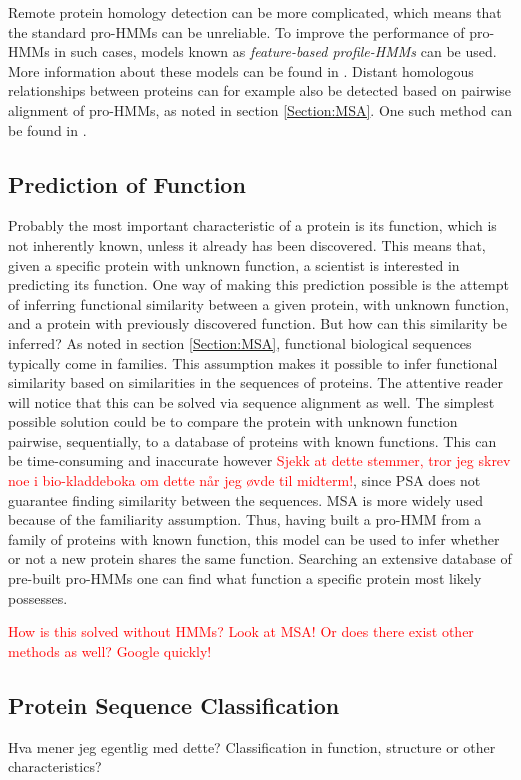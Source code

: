 \documentclass{article}\usepackage[]{graphicx}\usepackage[]{color}
\begin{document}
Remote protein homology detection can be more complicated, which means that the standard pro-HMMs can be unreliable. To improve the performance of pro-HMMs in such cases, models known as \textit{feature-based profile-HMMs} can be used. More information about these models can be found in \cite{Yoon2009}. Distant homologous relationships between proteins can for example also be detected based on pairwise alignment of pro-HMMs, as noted in section \ref{Section:MSA}. One such method can be found in \cite{Soding2005}.

\subsection{Prediction of Function}\label{Section:ProtPredFunc}
Probably the most important characteristic of a protein is its function, which is not inherently known, unless it already has been discovered. This means that, given a specific protein with unknown function, a scientist is interested in predicting its function. One way of making this prediction possible is the attempt of inferring functional similarity between a given protein, with unknown function, and a protein with previously discovered function. But how can this similarity be inferred? As noted in section \ref{Section:MSA}, functional biological sequences typically come in families. This assumption makes it possible to infer functional similarity based on similarities in the sequences of proteins. The attentive reader will notice that this can be solved via sequence alignment as well. The simplest possible solution could be to compare the protein with unknown function pairwise, sequentially, to a database of proteins with known functions. This can be time-consuming and inaccurate however \textcolor{red}{Sjekk at dette stemmer, tror jeg skrev noe i bio-kladdeboka om dette når jeg øvde til midterm!}, since PSA does not guarantee finding similarity between the sequences. MSA is more widely used because of the familiarity assumption. Thus, having built a pro-HMM from a family of proteins with known function, this model can be used to infer whether or not a new protein shares the same function. Searching an extensive database of pre-built pro-HMMs one can find what function a specific protein most likely possesses.

\textcolor{red}{How is this solved without HMMs? Look at MSA! Or does there exist other methods as well? Google quickly!}

\subsection{Protein Sequence Classification}\label{Section:ProtSeqClass}
Hva mener jeg egentlig med dette? Classification in function, structure or other characteristics?
\end{document}
